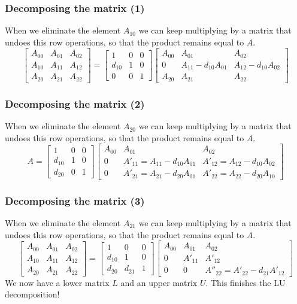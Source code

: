 \begin{frame}[fragile]
  \frametitle{Decomposing the matrix (1)}
  When we eliminate the element $A_{10}$ we can keep multiplying by a matrix that undoes this row operations, so that the product remains equal to $A$.
\[ 
\begin{bmatrix}
A_{00} & A_{01} & A_{02}\\ 
A_{10} & A_{11} & A_{12}\\ 
A_{20} & A_{21} & A_{22}
\end{bmatrix} = 
\begin{bmatrix}
1 & 0 & 0 \\
d_{10}& 1 & 0 \\
0 & 0 & 1
\end{bmatrix}
\begin{bmatrix}
A_{00} & A_{01} & A_{02}\\ 
0 & A_{11}-d_{10}A_{01} & A_{12}-d_{10}A_{02}\\ 
A_{20} & A_{21} & A_{22}
\end{bmatrix}
\]
\end{frame}

\begin{frame}[fragile]
  \frametitle{Decomposing the matrix (2)}
  When we eliminate the element $A_{20}$ we can keep multiplying by a matrix that undoes this row operations, so that the product remains equal to $A$.
\[ 
A = 
\begin{bmatrix}
1 & 0 & 0 \\
d_{10}& 1 & 0 \\
d_{20} & 0 & 1
\end{bmatrix}
\begin{bmatrix}
A_{00} & A_{01} & A_{02}\\ 
0 & A'_{11}=A_{11}-d_{10}A_{01} & A'_{12} = A_{12}-d_{10}A_{02}\\ 
0 & A'_{21} = A_{21}-d_{20}A_{01} & A'_{22} = A_{22}-d_{20}A_{10}
\end{bmatrix}
\]
\end{frame}

\begin{frame}[fragile]
  \frametitle{Decomposing the matrix (3)}
  When we eliminate the element $A_{21}$ we can keep multiplying by a matrix that undoes this row operations, so that the product remains equal to $A$.
\[ 
\begin{bmatrix}
A_{00} & A_{01} & A_{02}\\ 
A_{10} & A_{11} & A_{12}\\ 
A_{20} & A_{21} & A_{22}
\end{bmatrix} = 
\begin{bmatrix}
1 & 0 & 0 \\
d_{10}& 1 & 0 \\
d_{20} & d_{21} & 1
\end{bmatrix}
\begin{bmatrix}
A_{00} & A_{01} & A_{02}\\ 
0 & A'_{11} & A'_{12} \\ 
0 & 0  & A''_{22} = A'_{22}-d_{21}A'_{12}
\end{bmatrix}
\]\pause
We now have a lower matrix $L$ and an upper matrix $U$. This finishes the LU decomposition! 
\end{frame}

